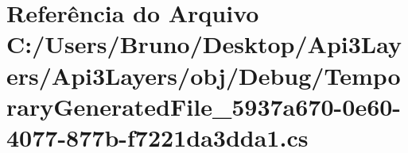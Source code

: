 \hypertarget{Api3Layers_2obj_2Debug_2TemporaryGeneratedFile__5937a670-0e60-4077-877b-f7221da3dda1_8cs}{}\section{Referência do Arquivo C\+:/\+Users/\+Bruno/\+Desktop/\+Api3\+Layers/\+Api3\+Layers/obj/\+Debug/\+Temporary\+Generated\+File\+\_\+5937a670-\/0e60-\/4077-\/877b-\/f7221da3dda1.cs}
\label{Api3Layers_2obj_2Debug_2TemporaryGeneratedFile__5937a670-0e60-4077-877b-f7221da3dda1_8cs}
